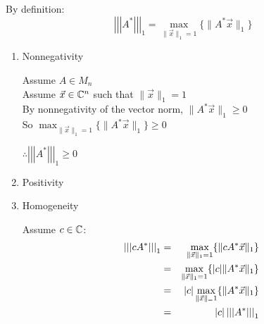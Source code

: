 \documentclass[letterpaper,12pt,fleqn]{article}
\newcommand{\mnorm}[1]{\left|\left|\left|#1\right|\right|\right|}
\newcommand{\norm}[1]{\|#1\|}
\newcommand{\vx}{\vec{x}}
\newcommand{\vy}{\vec{y}}
\newcommand{\vz}{\vec{0}}
\begin{document}
\begin{enumerate}
\begin{enumerate}
    By definition:
    \[\mnorm{A^*}_1=\max_{\norm{\vx}_1=1}\{\norm{A^*\vx}_1\}\]
    \begin{enumerate}
    \item Nonnegativity

      Assume $A\in M_n$ \\
      Assume $\vx\in\C^n$ such that $\norm{\vx}_1=1$ \\
      By nonnegativity of the vector norm, $\norm{A^*\vx}_1\ge0$ \\
      So $\max_{\norm{\vx}_1=1}\{\norm{A^*\vx}_1\}\ge0$
  
      $\therefore\mnorm{A^*}_1\ge0$

    \item Positivity

    \item Homogeneity
      
      Assume $c\in\mathbb{C}$:
      \begin{eqnarray*}
        \mnorm{cA^*}_1 &=& \max_{\norm{\vx}_1=1}\{\norm{cA^*\vx}_1\} \\
        &=& \max_{\norm{\vx}_1=1}\{\abs{c}\norm{A^*\vx}_1\} \\
        &=& \abs{c}\max_{\norm{\vx}_=1}\{\norm{A^*\vx}_1\} \\
        &=& \abs{c}\mnorm{A^*}_1
      \end{eqnarray*}


\end{enumerate}
\end{enumerate}
\end{enumerate}
\end{document}
